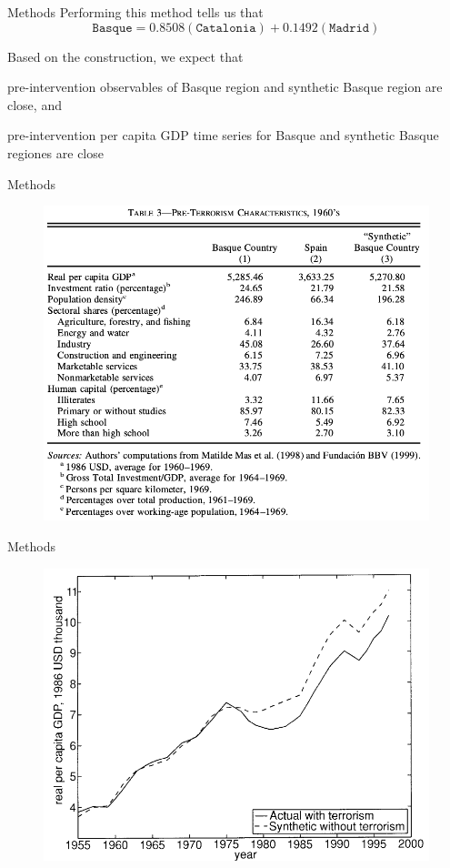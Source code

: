 \documentclass[notes,11pt, aspectratio=169]{beamer}
\newenvironment{wideitemize}{\itemize\addtolength{\itemsep}{10pt}}{\enditemize}
\begin{document}
\begin{frame}{Methods}
    Performing this method tells us that 
    \[\texttt{Basque} = 0.8508(\texttt{Catalonia}) + 0.1492 (\texttt{Madrid})\]

    Based on the construction, we expect that  \medskip 
    \begin{wideitemize}
        \item pre-intervention observables of Basque region and synthetic Basque region are close, and
        \item pre-intervention per capita GDP time series for Basque and synthetic Basque regiones are close
    \end{wideitemize}
\end{frame}


\begin{frame}{Methods}
    \begin{figure}
        \centering
        \includegraphics[width = .6\textwidth]{figures/balance panel all.png}
        \label{fig:balance_all}
    \end{figure}
\end{frame}

\begin{frame}{Methods}
    \begin{figure}
        \centering
        \includegraphics[width = .6\textwidth]{figures/ts.png}
        \label{fig:ts}
    \end{figure}
\end{frame}
\end{document}

